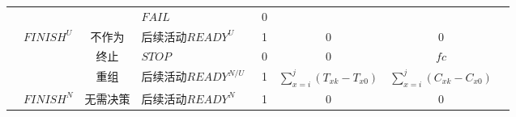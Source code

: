 \begin{table}[htbp]
\begin{threeparttable}
\begin{tabular}{llllllll}
            \multicolumn{1}{|c|}{} 
            &       
            & \multicolumn{1}{|c}{} 
            & \multicolumn{1}{|l}{$FAIL$} 
            & \multicolumn{1}{|c}{0} 
            & \multicolumn{1}{|c}{} 
            & \multicolumn{1}{|c|}{} \\
            \cline{2-7}
            
            \multicolumn{1}{|c|}{} 
            & \multirow{3}{*}{$FINISH^U$} 
            & \multicolumn{1}{|c}{不作为} 
            & \multicolumn{1}{|l}{后续活动$READY^U$~\tnote{4}} 
            & \multicolumn{1}{|c}{1} 
            & \multicolumn{1}{|c}{0} 
            & \multicolumn{1}{|c|}{0} \\
            \cline{3-7}
            
            \multicolumn{1}{|c|}{} 
            &       
            & \multicolumn{1}{|c}{终止} 
            & \multicolumn{1}{|l}{$STOP$} 
            & \multicolumn{1}{|c}{0} 
            & \multicolumn{1}{|c}{0} 
            & \multicolumn{1}{|c|}{$fc$} \\
            \cline{3-7}
            
            \multicolumn{1}{|c|}{} 
            &       
            & \multicolumn{1}{|c}{重组} 
            & \multicolumn{1}{|l}{后续活动$READY^{N/U}$~\tnote{4}} 
            & \multicolumn{1}{|c}{1} 
            & \multicolumn{1}{|c}{$\sum\limits_{x = i}^j {({T_{xk}} - {T_{x0}})} $} 
            & \multicolumn{1}{|c|}{$\sum\limits_{x = i}^j {({C_{xk}} - {C_{x0}})} $}  \\
            \cline{2-7}
            
            \multicolumn{1}{|c|}{} 
            & $FINISH^N$
            & \multicolumn{1}{|c}{无需决策} 
            & \multicolumn{1}{|l}{后续活动$READY^N$~\tnote{4}} 
            & \multicolumn{1}{|c}{1} 
            & \multicolumn{1}{|c}{0} 
            & \multicolumn{1}{|c|}{0} \\
            \bottomrule
            

\end{tabular}
\end{threeparttable}
\end{table}
